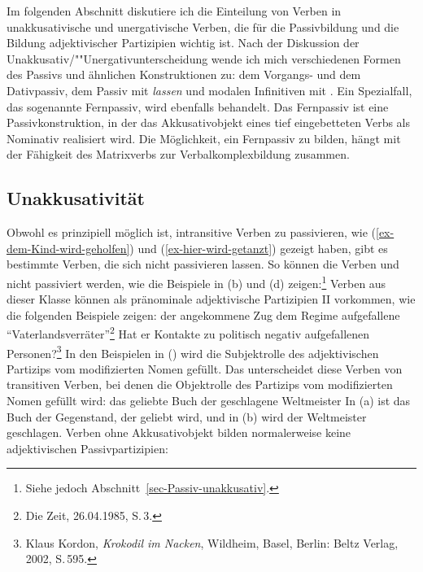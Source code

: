 Im folgenden Abschnitt diskutiere ich die Einteilung von Verben in unakkusativische und unergativische Verben,
die für die Passivbildung und die Bildung adjektivischer Partizipien wichtig ist. 
Nach der Diskussion der Unakkusativ/""Unergativunterscheidung wende ich
mich verschiedenen Formen des Passivs und ähnlichen Konstruktionen zu: dem Vorgangs- und
dem Dativpassiv, dem Passiv mit \emph{lassen} und modalen Infinitiven mit
\sein. Ein Spezialfall, das sogenannte Fernpassiv, wird ebenfalls behandelt. Das Fernpassiv
ist eine Passivkonstruktion, in der das Akkusativobjekt eines tief eingebetteten Verbs als
Nominativ realisiert wird. Die Möglichkeit, ein Fernpassiv zu bilden, hängt mit der Fähigkeit
des Matrixverbs zur Verbalkomplexbildung zusammen.

\subsection{Unakkusativität}
\label{sec-unakkusativitaet}\label{sec-unaccusativity}
\label{sec-phen-hilfsverbselektion}


Obwohl es prinzipiell möglich ist, intransitive Verben zu passivieren, wie
(\ref{ex-dem-Kind-wird-geholfen}) und (\ref{ex-hier-wird-getanzt}) gezeigt haben,
gibt es bestimmte Verben, die sich nicht passivieren lassen.
So können die Verben  und   nicht passiviert werden,
wie die Beispiele in (b) und (d) zeigen:\footnote{%
Siehe jedoch Abschnitt~\ref{sec-Passiv-unakkusativ}.
}
\eal
\label{ex-passive-erg}
\zl
{}%
Verben aus dieser Klasse können als pränominale adjektivische Partizipien II vorkommen,
wie die folgenden Beispiele zeigen:
\eal
\label{ex-prenominal-erg}
\ex 
der angekommene Zug
\ex
dem Regime aufgefallene "`Vaterlandsverräter"'\footnote{
        Die Zeit, 26.04.1985, S.\,3.%
}
\ex Hat er Kontakte zu politisch negativ aufgefallenen Personen?\footnote{
   Klaus Kordon, \emph{Krokodil im Nacken}, Wildheim, Basel, Berlin: Beltz Verlag, 2002, S.\,595.%
}
\zl
In den Beispielen in () wird die Subjektrolle des adjektivischen Partizips vom
modifizierten Nomen gefüllt. Das unterscheidet diese Verben von transitiven Verben,
bei denen die Objektrolle des Partizips vom modifizierten Nomen gefüllt wird:
\eal
\ex das geliebte Buch
\ex der geschlagene Weltmeister
\zl
In (a) ist das Buch der Gegenstand, der geliebt wird, und in (b)
wird der Weltmeister geschlagen. Verben ohne Akkusativobjekt bilden normalerweise
keine adjektivischen Passivpartizipien:
\eal
\label{ex-prenominal-nerg}
\zl

